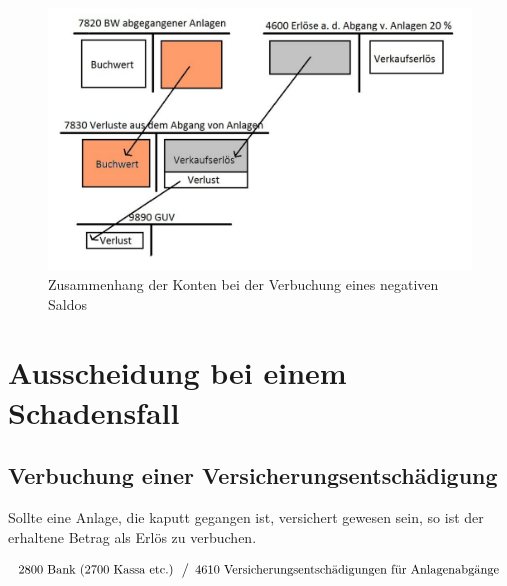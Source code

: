 \documentclass[a4paper,10pt]{report}
\begin{document}
\begin{figure}[ht]
\centering
\includegraphics[width=14cm]{Bilder/Verlustsumbuchung-Konten_der_Bilanz}
\caption{Zusammenhang der Konten bei der Verbuchung eines negativen
Saldos}
\end{figure}
\pagebreak

\section{Ausscheidung bei einem Schadensfall}
\subsection{Verbuchung einer Versicherungsentschädigung}
Sollte eine Anlage, die kaputt gegangen ist, versichert gewesen sein,
so ist der erhaltene Betrag als Erlös zu verbuchen.

\begin{equation*}
  \begin{array}{l}
    \text{2800 Bank (2700 Kassa etc.)}\\
  \end{array}
  \left\slash
    \begin{array}{l}
      \text{4610 Versicherungsentschädigungen für Anlagenabgänge}\\
    \end{array}
  \right.
\end{equation*}
\end{document}
